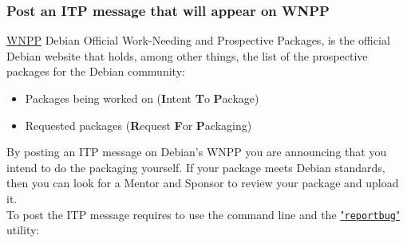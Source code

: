 \newpage

\subsubsection{Post an ITP message that will appear on WNPP}

\href{http://www.debian.org/devel/wnpp/}{WNPP} Debian Official Work-Needing and Prospective Packages, is the official Debian website that holds, 
among other things, the list of the prospective packages for the Debian community: 
\begin{itemize}
\item Packages being worked on ({\bf{I}}ntent {\bf{T}}o {\bf{P}}ackage)
\item Requested packages ({\bf{R}}equest {\bf{F}}or {\bf{P}}ackaging)
\end{itemize}
By posting an ITP message on Debian's WNPP you are announcing that you intend to do the packaging yourself. 
If your package meets Debian standards, then you can look for a Mentor and Sponsor to review your package and upload it. \\[0.25cm]
To post the ITP message requires to use the command line and the \href{https://wiki.debian.org/reportbug}{"\texttt{reportbug}"} utility:
